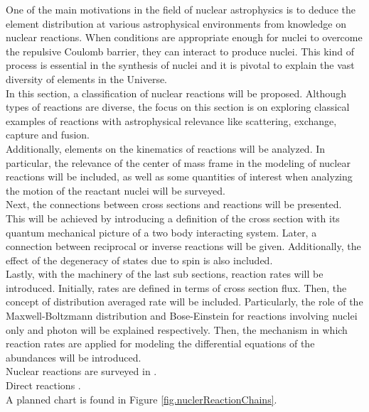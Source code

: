 \documentclass[openany]{book}
\begin{document}
One of the main motivations in the field of nuclear astrophysics is to deduce the element distribution at various astrophysical environments from knowledge on nuclear reactions. When conditions are appropriate enough for nuclei to overcome the repulsive Coulomb barrier, they can interact to produce nuclei. This kind of process is essential in the synthesis of nuclei and it is pivotal to explain the vast diversity of elements in the Universe.  \\

In this section, a classification of nuclear reactions will be proposed. Although types of reactions are diverse, the focus on this section is on exploring classical examples of reactions with astrophysical relevance like scattering, exchange, capture and fusion. \\

Additionally, elements on the kinematics of reactions will be analyzed. In particular, the relevance of the center of mass frame in the modeling of nuclear reactions will be included, as well as some quantities of interest when analyzing the motion of the reactant nuclei will be surveyed.  \\

Next, the connections between cross sections and reactions will be presented. This will be achieved by introducing a definition of the cross section with its quantum mechanical picture of a two body interacting system. Later, a connection between reciprocal or inverse reactions will be given. Additionally, the effect of the degeneracy of states due to spin is also included.  \\

Lastly, with the machinery of the last sub sections, reaction rates will be introduced. Initially, rates are defined in terms of cross section flux. Then, the concept of distribution averaged rate will be included. Particularly, the role of the Maxwell-Boltzmann distribution and Bose-Einstein for reactions involving nuclei only and photon will be explained respectively. Then, the mechanism in which reaction rates are applied for modeling the differential equations of the abundances will be introduced.  \\

Nuclear reactions are surveyed in \cite{bertulani_2003}. \\

Direct reactions \cite{bertulani_bonaccorso_2022}. \\

A planned chart is found in Figure \ref{fig.nuclerReactionChains}.
\end{document}
